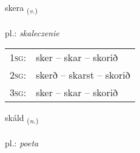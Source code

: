 \documentclass[frontgrid, backgrid]{flacards}\usepackage[]{graphicx}\usepackage[]{xcolor}
\begin{document}
\renewcommand{\flhead}{\vskip5pt \fboxsep=0pt {\small\bfseries\footnotesize Sagnorð | Verb}}
\renewcommand{\fcfoot}{\vskip5pt \fboxsep=0pt \hspace{2pt}{\small\bfseries\footnotesize 1K}}

\renewcommand{\blhead}{\vskip5pt {\small\bfseries\footnotesize Sagnorð | Verb }}
\renewcommand{\bcfoot}{\vskip5pt \hspace{2pt}{\small\bfseries\footnotesize 1K}}


{skera \small{\textsubscript{(\textit{v.})}} \\[1ex] %
\textphonetic{[scɛːra]} \\
pl.: \emph{skaleczenie} \\  [2ex]
\renewcommand*{\arraystretch}{0.8}
\begin{tabular}{p{1cm}l}
\textsc{1sg}: & sker -- skar -- skorið \\ 
\textsc{2sg}: & skerð -- skarst -- skorið \\ 
\textsc{3sg}: & sker -- skar -- skorið \\ 
\end{tabular}
}

\renewcommand{\flhead}{\vskip5pt \fboxsep=0pt {\small\bfseries\footnotesize Nafnorð | Noun}}
\renewcommand{\fcfoot}{\vskip5pt \fboxsep=0pt \hspace{2pt}{\small\bfseries\footnotesize 1K}}

\renewcommand{\blhead}{\vskip5pt {\small\bfseries\footnotesize Nafnorð | Noun }}
\renewcommand{\bcfoot}{\vskip5pt \hspace{2pt}{\small\bfseries\footnotesize 1K}}


{skáld \small{\textsubscript{(\textit{n.})}} \\[1ex] %
\textphonetic{[skault]} \\
pl.: \emph{poeta} \\  [2ex]
\renewcommand*{\arraystretch}{0.8}
}
\end{document}
